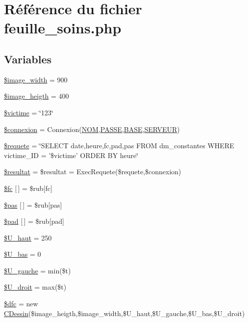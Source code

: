 \hypertarget{feuille__soins_8php}{
\section{R\'{e}f\'{e}rence du fichier feuille\_\-soins.php}
\label{feuille__soins_8php}
}
\subsection*{Variables}
\begin{CompactItemize}
\item 
\hyperlink{feuille__soins_8php_a0}{\$image\_\-width} = 900
\item 
\hyperlink{feuille__soins_8php_a1}{\$image\_\-heigth} = 400
\item 
\hyperlink{feuille__soins_8php_a2}{\$victime} = \char`\"{}123\char`\"{}
\item 
\hyperlink{feuille__soins_8php_a3}{\$connexion} = Connexion(\hyperlink{pma__connect_8php_a0}{NOM},\hyperlink{pma__connect_8php_a1}{PASSE},\hyperlink{pma__connect_8php_a3}{BASE},\hyperlink{pma__connect_8php_a2}{SERVEUR})
\item 
\hyperlink{feuille__soins_8php_a4}{\$requete} = \char`\"{}SELECT date,heure,fc,pad,pas FROM dm\_\-constantes WHERE victime\_\-ID = '\$victime' ORDER BY heure\char`\"{}
\item 
\hyperlink{feuille__soins_8php_a5}{\$resultat} = \$resultat = Exec\-Requete(\$requete,\$connexion)
\item 
\hyperlink{feuille__soins_8php_a6}{\$fc} \mbox{[}$\,$\mbox{]} = \$rub\mbox{[}fc\mbox{]}
\item 
\hyperlink{feuille__soins_8php_a7}{\$pas} \mbox{[}$\,$\mbox{]} = \$rub\mbox{[}pas\mbox{]}
\item 
\hyperlink{feuille__soins_8php_a8}{\$pad} \mbox{[}$\,$\mbox{]} = \$rub\mbox{[}pad\mbox{]}
\item 
\hyperlink{feuille__soins_8php_a9}{\$U\_\-haut} = 250
\item 
\hyperlink{feuille__soins_8php_a10}{\$U\_\-bas} = 0
\item 
\hyperlink{feuille__soins_8php_a11}{\$U\_\-gauche} = min(\$t)
\item 
\hyperlink{feuille__soins_8php_a12}{\$U\_\-droit} = max(\$t)
\item 
\hyperlink{feuille__soins_8php_a13}{\$dfc} = new \hyperlink{classCDessin}{CDessin}(\$image\_\-heigth,\$image\_\-width,\$U\_\-haut,\$U\_\-gauche,\$U\_\-bas,\$U\_\-droit)
\item 

\end{CompactItemize}
